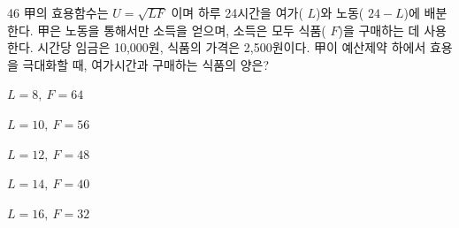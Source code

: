 \begin{question}{46}
甲의 효용함수는 $U=\sqrt{LF}$ 이며 하루 24시간을 여가( $L$)와 노동( $24-L$)에 배분한다. 甲은 노동을 통해서만 소득을 얻으며, 소득은 모두 식품( $F$)을 구매하는 데 사용한다. 시간당 임금은 10,000원, 식품의 가격은 2,500원이다. 甲이 예산제약 하에서 효용을 극대화할 때, 여가시간과 구매하는 식품의 양은?
\begin{choices}
  \item $L=8,\ F=64$
  \item $L=10,\ F=56$
  \item $L=12,\ F=48$
  \item $L=14,\ F=40$
  \item $L=16,\ F=32$
\end{choices}
\end{question}
